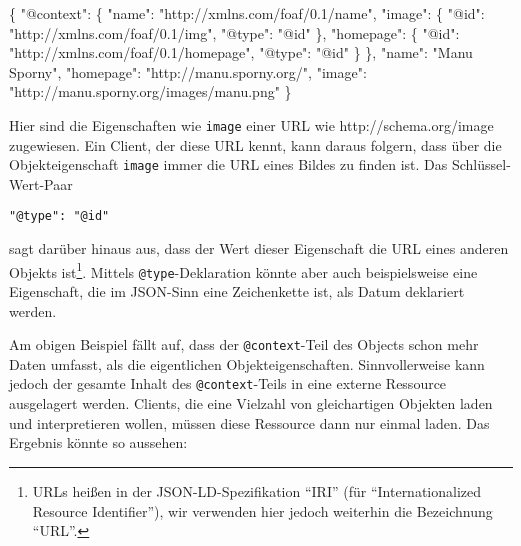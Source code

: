 \documentclass[,a4paper]{article}
\newenvironment{Shaded}{}{}
\newcommand{\DataTypeTok}[1]{\textcolor[rgb]{0.56,0.13,0.00}{{#1}}}
\newcommand{\StringTok}[1]{\textcolor[rgb]{0.25,0.44,0.63}{{#1}}}
\newcommand{\NormalTok}[1]{{#1}}
\begin{document}
\begin{Shaded}
\begin{Highlighting}[]
\NormalTok{\{}
  \DataTypeTok{"@context"}\NormalTok{:}
  \NormalTok{\{}
    \DataTypeTok{"name"}\NormalTok{: }\StringTok{"http://xmlns.com/foaf/0.1/name"}\NormalTok{,}
    \DataTypeTok{"image"}\NormalTok{: \{}
      \DataTypeTok{"@id"}\NormalTok{: }\StringTok{"http://xmlns.com/foaf/0.1/img"}\NormalTok{,}
      \DataTypeTok{"@type"}\NormalTok{: }\StringTok{"@id"}
    \NormalTok{\},}
    \DataTypeTok{"homepage"}\NormalTok{: \{}
      \DataTypeTok{"@id"}\NormalTok{: }\StringTok{"http://xmlns.com/foaf/0.1/homepage"}\NormalTok{,}
      \DataTypeTok{"@type"}\NormalTok{: }\StringTok{"@id"}
    \NormalTok{\}}
  \NormalTok{\},}
  \DataTypeTok{"name"}\NormalTok{: }\StringTok{"Manu Sporny"}\NormalTok{,}
  \DataTypeTok{"homepage"}\NormalTok{: }\StringTok{"http://manu.sporny.org/"}\NormalTok{,}
  \DataTypeTok{"image"}\NormalTok{: }\StringTok{"http://manu.sporny.org/images/manu.png"}
\NormalTok{\}}
\end{Highlighting}
\end{Shaded}

Hier sind die Eigenschaften wie \texttt{image} einer URL wie
http://schema.org/image zugewiesen. Ein Client, der diese URL kennt,
kann daraus folgern, dass über die Objekteigenschaft \texttt{image}
immer die URL eines Bildes zu finden ist. Das Schlüssel-Wert-Paar

\begin{verbatim}
"@type": "@id"
\end{verbatim}

sagt darüber hinaus aus, dass der Wert dieser Eigenschaft die URL eines
anderen Objekts ist\footnote{URLs heißen in der JSON-LD-Spezifikation
  ``IRI'' (für ``Internationalized Resource Identifier''), wir verwenden
  hier jedoch weiterhin die Bezeichnung ``URL''.}. Mittels
\texttt{@type}-Deklaration könnte aber auch beispielsweise eine
Eigenschaft, die im JSON-Sinn eine Zeichenkette ist, als Datum
deklariert werden.

Am obigen Beispiel fällt auf, dass der \texttt{@context}-Teil des
Objects schon mehr Daten umfasst, als die eigentlichen
Objekteigenschaften. Sinnvollerweise kann jedoch der gesamte Inhalt des
\texttt{@context}-Teils in eine externe Ressource ausgelagert werden.
Clients, die eine Vielzahl von gleichartigen Objekten laden und
interpretieren wollen, müssen diese Ressource dann nur einmal laden. Das
Ergebnis könnte so aussehen:
\end{document}
